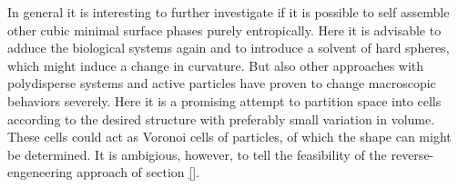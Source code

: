 \documentclass[epj,onecolumn]{webofc}
\begin{document}
In general it is interesting to further investigate if it is possible to self assemble other cubic minimal surface phases purely entropically.  Here it is advisable to adduce the biological systems again and to introduce a solvent of hard spheres, which might induce a change in curvature. But also other approaches with polydisperse systems and active particles have proven to change macroscopic behaviors severely. Here it is a promising attempt to partition space into cells according to the desired structure with preferably small variation in volume. These cells could act as Voronoi cells of particles, of which the shape can might be determined. It is ambigious, however, to tell the feasibility of the reverse-engeneering approach of section \ref{}.  


\end{document}
